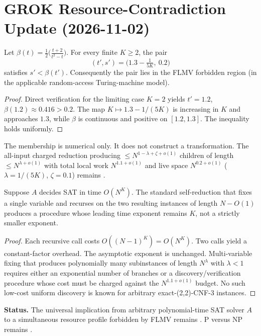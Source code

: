 
\section*{GROK Resource-Contradiction Update (2026-11-02)}

\begin{theorem}
Let \(\beta(t) = \frac12 \bigl( \frac{t+2}{t^2 - t} \bigr)\). For every finite \(K \ge 2\), the pair
\[
(t', s') = \bigl(1.3 - \tfrac1{5K},\ 0.2\bigr)
\]
satisfies \( s' < \beta(t') \). Consequently the pair lies in the FLMV forbidden region (in the applicable random-access Turing-machine model).
\end{theorem}

\begin{proof}
Direct verification for the limiting case \(K=2\) yields \(t' = 1.2\), \(\beta(1.2) \approx 0.416 > 0.2\). The map \(K \mapsto 1.3 - 1/(5K)\) is increasing in \(K\) and approaches \(1.3\), while \(\beta\) is continuous and positive on \([1.2,1.3]\). The inequality holds uniformly.
\end{proof}

\begin{remark}
The membership is numerical only. It does not construct a transformation. The all-input charged reduction producing \(\le N^{1-\lambda+\zeta+o(1)}\) children of length \(\le N^{\lambda+o(1)}\) with total local work \(N^{1.1+o(1)}\) and live space \(N^{0.2+o(1)}\) (\(\lambda=1/(5K)\), \(\zeta=0.1\)) remains \OPEN.
\end{remark}

\begin{lemma}
Suppose \(A\) decides SAT in time \(O(N^K)\). The standard self-reduction that fixes a single variable and recurses on the two resulting instances of length \(N-O(1)\) produces a procedure whose leading time exponent remains \(K\), not a strictly smaller exponent.
\end{lemma}

\begin{proof}
Each recursive call costs \(O((N-1)^K) = O(N^K)\). Two calls yield a constant-factor overhead. The asymptotic exponent is unchanged. Multi-variable fixing that produces polynomially many subinstances of length \(N^\lambda\) with \(\lambda<1\) requires either an exponential number of branches or a discovery/verification procedure whose cost must be charged against the \(N^{1.1+o(1)}\) budget. No such low-cost uniform discovery is known for arbitrary exact-(2,2)-CNF-3 instances.
\end{proof}

\textbf{Status.} The universal implication from arbitrary polynomial-time SAT solver \(A\) to a simultaneous resource profile forbidden by FLMV remains \OPEN. P versus NP remains \OPEN.
